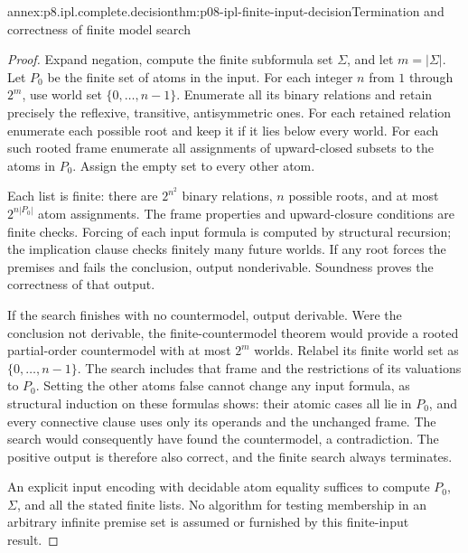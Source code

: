 \begin{annexitem}{annex:p8.ipl.complete.decision}{thm:p08-ipl-finite-input-decision}{Termination and correctness of finite model search}
\begin{proof}
Expand negation, compute the finite subformula set \(\Sigma\), and
let \(m=|\Sigma|\). Let \(P_0\) be the finite set of atoms in
the input. For each integer \(n\) from \(1\) through \(2^m\),
use world set \(\{0,\ldots,n-1\}\). Enumerate all its binary
relations and retain precisely the reflexive, transitive, antisymmetric
ones. For each retained relation enumerate each possible root and keep
it if it lies below every world. For each such rooted frame enumerate
all assignments of upward-closed subsets to the atoms in \(P_0\).
Assign the empty set to every other atom.

Each list is finite: there are \(2^{n^2}\) binary relations, \(n\)
possible roots, and at most \(2^{n|P_0|}\) atom assignments. The
frame properties and upward-closure conditions are finite checks.
Forcing of each input formula is computed by structural recursion;
the implication clause checks finitely many future worlds. If any root
forces the premises and fails the conclusion, output nonderivable.
Soundness proves the correctness of that output.

If the search finishes with no countermodel, output derivable. Were the
conclusion not derivable, the finite-countermodel theorem would provide
a rooted partial-order countermodel with at most \(2^m\) worlds.
Relabel its finite world set as \(\{0,\ldots,n-1\}\).
The search includes that frame and the restrictions of its valuations
to \(P_0\). Setting the other atoms false cannot change any input
formula, as structural induction on these formulas shows: their atomic
cases all lie in \(P_0\), and every connective clause uses only its
operands and the unchanged frame. The search would consequently have
found the countermodel, a contradiction. The positive output is
therefore also correct, and the finite search always terminates.

An explicit input encoding with decidable atom equality suffices to
compute \(P_0\), \(\Sigma\), and all the stated finite lists.
No algorithm for testing membership in an arbitrary infinite premise
set is assumed or furnished by this finite-input result.
\end{proof}
\end{annexitem}
